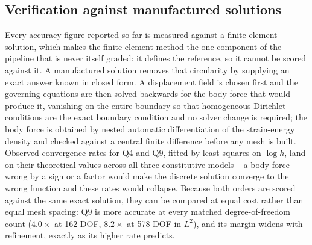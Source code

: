 \documentclass[final,5p,times]{elsarticle}
\begin{document}
\subsection{Verification against manufactured solutions}
Every accuracy figure reported so far is measured against a finite-element
solution, which makes the finite-element method the one component of the
pipeline that is never itself graded: it defines the reference, so it
cannot be scored against it. A manufactured solution removes that
circularity by supplying an exact answer known in closed form. A
displacement field is chosen first and the governing equations are then
solved backwards for the body force that would produce it, vanishing on
the entire boundary so that homogeneous Dirichlet conditions are the
exact boundary condition and no solver change is required; the body force
is obtained by nested automatic differentiation of the strain-energy
density and checked against a central finite difference before any mesh
is built. Observed convergence rates for Q4 and Q9, fitted by least
squares on $\log h$, land on their theoretical values across all three
constitutive models -- a body force wrong by a sign or a factor would
make the discrete solution converge to the wrong function and these rates
would collapse. Because both orders are scored against the same exact
solution, they can be compared at equal cost rather than equal mesh
spacing: Q9 is more accurate at every matched degree-of-freedom count
($4.0\times$ at 162 DOF, $8.2\times$ at 578 DOF in $L^2$), and its margin
widens with refinement, exactly as its higher rate predicts.
\end{document}
